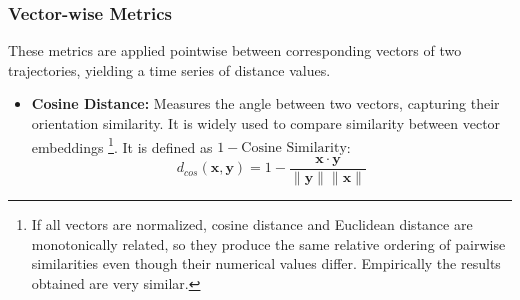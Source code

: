 \documentclass[a4paper,12pt]{article}
\begin{document}
\subsubsection{Vector-wise Metrics}
\label{sssec:methods_vector_metrics}
These metrics are applied pointwise between corresponding vectors of two trajectories, yielding a time series of distance values.
\begin{itemize}
    \item \textbf{Cosine Distance:} Measures the angle between two vectors, capturing their orientation similarity. It is widely used to compare similarity between vector embeddings \footnote{If all vectors are normalized, cosine distance and Euclidean distance are monotonically related, so they produce the same relative ordering of pairwise similarities even though their numerical values differ. Empirically the results obtained are very similar.}. It is defined as $1 - \text{Cosine Similarity}$:
    \begin{equation}
        d_{cos}(\mathbf{x}, \mathbf{y}) = 1 - \frac{\mathbf{x} \cdot \mathbf{y}}{\|\mathbf{y}\| \|\mathbf{x}\|}
    \end{equation}
\end{itemize}
\end{document}

